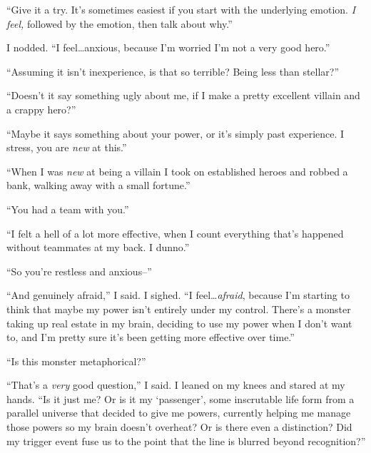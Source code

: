 ``Give it a try.  It's sometimes easiest if you start with the underlying emotion.  \emph{I feel, }followed by the emotion, then talk about why.''



I nodded.  ``I feel\ldots anxious, because I'm worried I'm not a very good hero.''



``Assuming it isn't inexperience, is that so terrible?  Being less than stellar?''



``Doesn't it say something ugly about me, if I make a pretty excellent villain and a crappy hero?''



``Maybe it says something about your power, or it's simply past experience.  I stress, you are \emph{new} at this.''



``When I was \emph{new} at being a villain I took on established heroes and robbed a bank, walking away with a small fortune.''



``You had a team with you.''



``I felt a hell of a lot more effective, when I count everything that's happened without teammates at my back.  I dunno.''



``So you're restless and anxious--''



``And genuinely afraid,'' I said.  I sighed.  ``I feel\ldots \emph{afraid}, because I'm starting to think that maybe my power isn't entirely under my control.  There's a monster taking up real estate in my brain, deciding to use my power when I don't want to, and I'm pretty sure it's been getting more effective over time.''



``Is this monster metaphorical?''



``That's a \emph{very} good question,'' I said.  I leaned on my knees and stared at my hands.  ``Is it just me?  Or is it my `passenger', some inscrutable life form from a parallel universe that decided to give me powers, currently helping me manage those powers so my brain doesn't overheat?  Or is there even a distinction?  Did my trigger event fuse us to the point that the line is blurred beyond recognition?''



